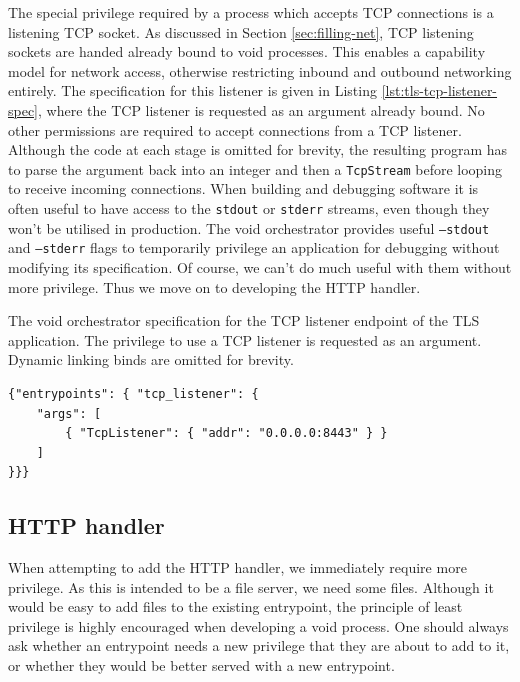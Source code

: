 \documentclass[12pt,a4paper,twoside]{report}
\begin{document}
The special privilege required by a process which accepts TCP connections is a listening TCP socket. As discussed in Section \ref{sec:filling-net}, TCP listening sockets are handed already bound to void processes. This enables a capability model for network access, otherwise restricting inbound and outbound networking entirely. The specification for this listener is given in Listing \ref{lst:tls-tcp-listener-spec}, where the TCP listener is requested as an argument already bound. No other permissions are required to accept connections from a TCP listener. Although the code at each stage is omitted for brevity, the resulting program has to parse the argument back into an integer and then a \texttt{TcpStream} before looping to receive incoming connections. When building and debugging software it is often useful to have access to the \texttt{stdout} or \texttt{stderr} streams, even though they won't be utilised in production. The void orchestrator provides useful \texttt{--stdout} and \texttt{--stderr} flags to temporarily privilege an application for debugging without modifying its specification. Of course, we can't do much useful with them without more privilege. Thus we move on to developing the HTTP handler.

\begin{listing}
\label{lst:tls-tcp-listener-spec}
\caption{The void orchestrator specification for the TCP listener endpoint of the TLS application. The privilege to use a TCP listener is requested as an argument. Dynamic linking binds are omitted for brevity.}

\begin{verbatim}
{"entrypoints": { "tcp_listener": {
	"args": [
		{ "TcpListener": { "addr": "0.0.0.0:8443" } }
	]
}}}
\end{verbatim}
\end{listing}

\subsection{HTTP handler}
\label{sec:building-tls-http-handler}

When attempting to add the HTTP handler, we immediately require more privilege. As this is intended to be a file server, we need some files. Although it would be easy to add files to the existing entrypoint, the principle of least privilege is highly encouraged when developing a void process. One should always ask whether an entrypoint needs a new privilege that they are about to add to it, or whether they would be better served with a new entrypoint.
\end{document}
